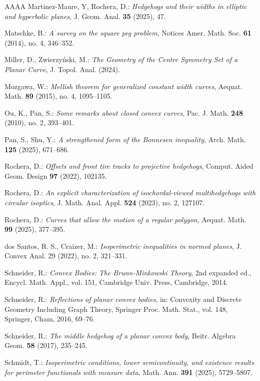 \documentclass{amsart}
\theoremstyle{definition}
\numberwithin{equation}{section}
\begin{document}
\begin{thebibliography}{AAAA}
 Martinez-Maure, Y, Rochera, D.: \emph{Hedgehogs and their widths in elliptic and hyperbolic planes}, J. Geom. Anal. \textbf{35} (2025), 47.

 Matschke, B.: \emph{A survey on the square peg problem}, Notices Amer. Math. Soc. \textbf{61} (2014), no. 4, 346--352.

 Miller, D., Zwierzy\'nski, M.: \emph{The Geometry of the Centre Symmetry Set of a Planar Curve}, J. Topol. Anal. (2024).

 Mozgawa, W.: \emph{Mellish theorem for generalized constant width curves},
Aequat. Math. \textbf{89} (2015), no. 4, 1095--1105.

 Ou, K., Pan, S.: \emph{Some remarks about closed convex curves}, Pac. J. Math. \textbf{248} (2010), no. 2, 393--401.

 Pan, S., Shu, Y.: \emph{A strengthened form of the Bonnesen inequality}, Arch. Math. \textbf{125} (2025), 671--686.

 Rochera, D.: \emph{Offsets and front tire tracks to projective hedgehogs}, Comput. Aided Geom. Design \textbf{97} (2022), 102135.

 Rochera, D.: \emph{An explicit characterization of isochordal-viewed multihedgehogs with circular isoptics}, J. Math. Anal. Appl. \textbf{524} (2023), no. 2, 127107.

 Rochera, D.: \emph{Curves that allow the motion of a regular polygon}, Aequat. Math. \textbf{99} (2025), 377--395.

 dos Santos, R. S., Craizer, M.: \emph{Isoperimetric inequalities in normed planes}, J. Convex Anal. 29 (2022), no. 2, 321--331.

 Schneider, R.: \emph{Convex Bodies: The Brunn-Minkowski Theory}, 2nd expanded ed., Encycl. Math. Appl., vol. 151, Cambridge Univ. Press, Cambridge, 2014.

 Schneider, R.: \emph{Reflections of planar convex bodies}, in: {Convexity and Discrete Geometry Including Graph Theory},
Springer Proc. Math. Stat., vol. 148, Springer, Cham, 2016, 69--76.

 Schneider, R.: \emph{The middle hedgehog of a planar convex body}, Beitr. Algebra Geom. \textbf{58} (2017), 235--245.

 Schmidt, T.: \emph{Isoperimetric conditions, lower semicontinuity, and existence results for perimeter functionals with measure data}, Math. Ann. \textbf{391} (2025), 5729--5807.


\end{thebibliography}
\end{document}
